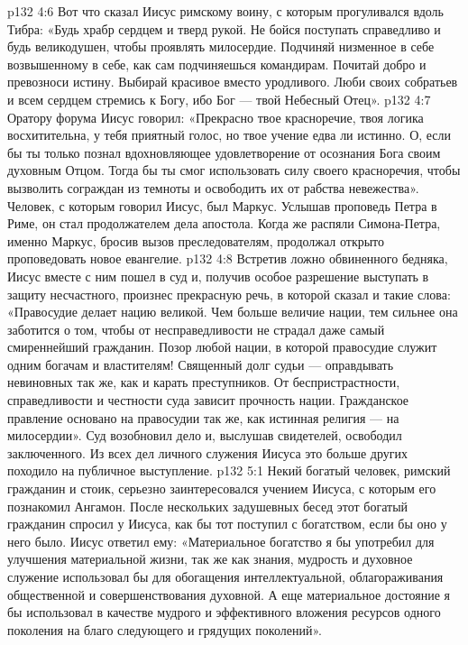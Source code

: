 \vs p132 4:6 \pc Вот что сказал Иисус римскому воину, с которым прогуливался вдоль Тибра: «Будь храбр сердцем и тверд рукой. Не бойся поступать справедливо и будь великодушен, чтобы проявлять милосердие. Подчиняй низменное в себе возвышенному в себе, как сам подчиняешься командирам. Почитай добро и превозноси истину. Выбирай красивое вместо уродливого. Люби своих собратьев и всем сердцем стремись к Богу, ибо Бог --- твой Небесный Отец».
\vs p132 4:7 \pc Оратору форума Иисус говорил: «Прекрасно твое красноречие, твоя логика восхитительна, у тебя приятный голос, но твое учение едва ли истинно. О, если бы ты только познал вдохновляющее удовлетворение от осознания Бога своим духовным Отцом. Тогда бы ты смог использовать силу своего красноречия, чтобы вызволить сограждан из темноты и освободить их от рабства невежества». Человек, с которым говорил Иисус, был Маркус. Услышав проповедь Петра в Риме, он стал продолжателем дела апостола. Когда же распяли Симона\hyp{}Петра, именно Маркус, бросив вызов преследователям, продолжал открыто проповедовать новое евангелие.
\vs p132 4:8 \pc Встретив ложно обвиненного бедняка, Иисус вместе с ним пошел в суд и, получив особое разрешение выступать в защиту несчастного, произнес прекрасную речь, в которой сказал и такие слова: «Правосудие делает нацию великой. Чем больше величие нации, тем сильнее она заботится о том, чтобы от несправедливости не страдал даже самый смиреннейший гражданин. Позор любой нации, в которой правосудие служит одним богачам и властителям! Священный долг судьи --- оправдывать невиновных так же, как и карать преступников. От беспристрастности, справедливости и честности суда зависит прочность нации. Гражданское правление основано на правосудии так же, как истинная религия --- на милосердии». Суд возобновил дело и, выслушав свидетелей, освободил заключенного. Из всех дел личного служения Иисуса это больше других походило на публичное выступление.
\vs p132 5:1 Некий богатый человек, римский гражданин и стоик, серьезно заинтересовался учением Иисуса, с которым его познакомил Ангамон. После нескольких задушевных бесед этот богатый гражданин спросил у Иисуса, как бы тот поступил с богатством, если бы оно у него было. Иисус ответил ему: «Материальное богатство я бы употребил для улучшения материальной жизни, так же как знания, мудрость и духовное служение использовал бы для обогащения интеллектуальной, облагораживания общественной и совершенствования духовной. А еще материальное достояние я бы использовал в качестве мудрого и эффективного вложения ресурсов одного поколения на благо следующего и грядущих поколений».
